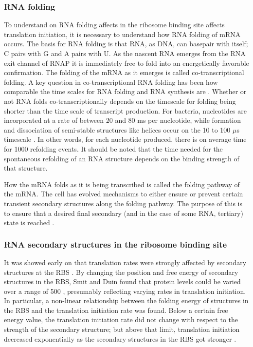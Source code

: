 \subsubsection{RNA folding} To understand on RNA folding affects in the
ribosome binding site affects translation initiation, it is necessary to
understand how RNA folding of mRNA occurs. The basis for RNA folding is that
RNA, as DNA, can basepair with itself; C pairs with G and A pairs with U. As
the nascent RNA emerges from the RNA exit channel of RNAP it is immediately
free to fold into an energetically favorable confirmation. The folding of the
mRNA as it emerges is called co-transcriptional folding. A key question in
co-transcriptional RNA folding has been how comparable the time scales for RNA
folding and RNA synthesis are \cite{de_smit_translational_2003-1}. Whether or
not RNA folds co-transcriptionally depends on the timescale for folding being
shorter than the time scale of transcript production. For bacteria, nucleotides
are incorporated at a rate of between 20 and 80 ms per nucleotide, while
formation and dissociation of semi-stable structures like helices occur on the
10 to 100 $\mu$s timescale \cite{isambert_jerky_2009}. In other words, for each
nucleotide produced, there is on average time for 1000 refolding events. It
should be noted that the time needed for the spontaneous refolding of an RNA
structure depends on the binding strength of that structure.

How the mRNA folds as it is being transcribed is called the folding pathway of
the mRNA. The cell has evolved mechanisms to either ensure or prevent certain
transient secondary structures along the folding pathway. The purpose of this
is to ensure that a desired final secondary (and in the case of some RNA,
tertiary) state is reached \cite{pan_rna_2006-1}.

\subsubsection{RNA secondary structures in the ribosome binding site} It was
showed early on that translation rates were strongly affected by secondary
structures at the RBS \cite{hall_role_1982}. By changing the position and free
energy of secondary structures in the RBS, Smit and Duin found that protein
levels could be varied over a range of 500 \cite{de_smit_secondary_1990},
presumably reflecting varying rates in translation initiation. In particular, a
non-linear relationship between the folding energy of structures in the RBS and
the translation initiation rate was found. Below a certain free energy value,
the translation initiation rate did not change with respect to the strength of
the secondary structure; but above that limit, translation initiation decreased
exponentially as the secondary structures in the RBS got stronger
\cite{de_smit_secondary_1990}.

